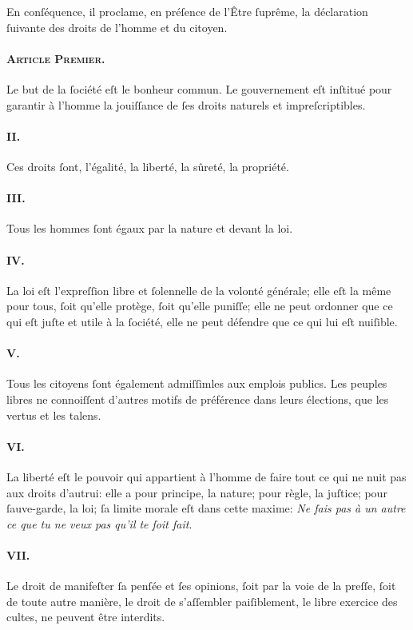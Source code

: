 \documentclass[10pt, twoside]{lecturenotes}
\begin{document}
En conſéquence, il proclame, en préſence de l'Être ſuprême, la déclaration ſuivante des droits de l'homme et du citoyen.
\paragraph*{\textsc{Article Premier.\\}}
Le but de la ſociété eſt le bonheur commun.
Le gouvernement eſt inſtitué pour garantir à l'homme la jouiſſance de ſes droits naturels et impreſcriptibles.
\paragraph*{II.} Ces droits ſont, l'égalité, la liberté, la sûreté, la propriété.
\paragraph*{III.}Tous les hommes ſont égaux par la nature et devant la loi.
\paragraph*{IV.}La loi eſt l'expreſſion libre et ſolennelle de la volonté générale; elle eſt la même pour tous, ſoit qu'elle protège, ſoit qu'elle puniſſe; elle ne peut ordonner que ce qui eſt juſte et utile à la ſociété, elle ne peut défendre que ce qui lui eſt nuiſible.
\paragraph*{V.}Tous les citoyens ſont également admiſſimles aux emplois publics. Les peuples libres ne connoiſſent d'autres motifs de préférence dans leurs élections, que les vertus et les talens.
\paragraph*{VI.}La liberté eſt le pouvoir qui appartient à l'homme de faire tout ce qui ne nuit pas aux droits d'autrui: elle a pour principe, la nature; pour règle, la juſtice; pour ſauve-garde, la loi; ſa limite morale eſt dans cette maxime: \emph{Ne fais pas à un autre ce que tu ne veux pas qu'il te ſoit fait}.
\paragraph*{VII.}Le droit de manifeſter ſa penſée et ſes opinions, ſoit par la voie de la preſſe, ſoit de toute autre manière, le droit de s'aſſembler paiſiblement, le libre exercice des  cultes, ne peuvent être interdits.
\end{document}
